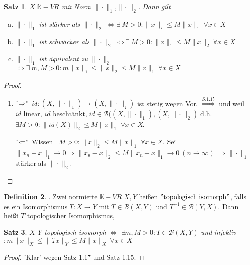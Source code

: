 \documentclass[ngerman]{report}
\theoremstyle{plain}%
\newtheorem{thm}{Satz}[chapter]
\theoremstyle{definition}%
\newtheorem{definition}[thm]{Definition}
\theoremstyle{myStyle}
\newcommand{\K}{\mathbb{K}}
\newcommand{\B}{\mathcal{B}} %
\newcommand{\BS}[1][X,Y]{\mathcal{B}(#1)} %
\newcommand{\norm}[1]{\|#1\|}
\newcommand{\df}[1][]{%
	\overset{#1}{\Rightarrow}
}
\newcommand{\aq}{\Leftrightarrow} %
\newcommand{\inv}[1]{#1^{-1}}
\newcommand{\qmarks}[1]{$"\text{#1}"$}
\begin{document}
	\begin{thm}
		$X$ $\K-VR$ mit Norm $\norm{\cdot}_1$,$\norm{\cdot}_2$. Dann gilt 
			\begin{enumerate}[(a)]
				\item $\norm{\cdot}_1$ ist stärker als $\norm{\cdot}_2$ 
					$\aq \exists \: M > 0: \norm{x}_2 \leq M \norm{x}_1 \; \forall x\in X$
				\item $\norm{\cdot}_1$ ist schwächer als $\norm{\cdot}_2$ 
					$\aq \exists \: M > 0: \norm{x}_1 \leq M \norm{x}_2 \; \forall x\in X$
				\item $\norm{\cdot}_1$ ist äquivalent zu $\norm{\cdot}_2$ 
					$\aq \exists \: m,M > 0: m\norm{x}_1 \leq \norm{x}_2 \leq M \norm{x}_1 \; \forall x\in X$
			\end{enumerate}
	
	\end{thm}
	\begin{proof}
		\begin{enumerate}[zu (a):]
	 		\item \qmarks{$\df$} $id : (X,\norm{\cdot}_1) \to (X,\norm{\cdot}_2)$ ist stetig wegen Vor.
				$\df[S.1.15]$ und weil $id$ linear, $id$ beschränkt, 
				$id\in \B((X,\norm{\cdot}_1), (X,\norm{\cdot}_2)$ d.h. 
				$\exists M > 0: \norm{id(X)}_2 \leq M \norm{x}_1 \; \forall x\in X$.\par
			\qmarks{$\Leftarrow$}	Wissen $\exists M>0: \norm{x}_2 \leq M\norm{x}_1 \; \forall x\in X$.
			Sei $\norm{x_n - x}_1 \to 0 \df \norm{x_n - x}_2 \leq M\norm{x_n - x}_1 \to 0 \; (n\to\infty)$
			$\df \norm{\cdot}_1$ stärker als $\norm{\cdot}_2$.
	 	\end{enumerate}
	\end{proof}

	\begin{definition}
		.
		Zwei normierte $\K-VR$ $X,Y$ heißen \qmarks{topologisch isomorph}, falls es ein Isomorphismus 
		$T: X\to Y$ mit $T\in \BS$ und $\inv{T}\in\B(Y,X)$. Dann heißt $T$ topologischer Isomorphismus,
	\end{definition}

	\begin{thm}
		$X, Y$ topologisch isomorph $\aq$ $\exists m,M > 0: T\in \BS$ und injektiv
		$: m\norm{x}_X \leq \norm{Tx}_Y \leq M \norm{x}_X \; \forall x\in X$
	\end{thm}
	\begin{proof}
		'Klar' wegen Satz 1.17 und Satz 1.15.
	\end{proof}
	
\end{document}
